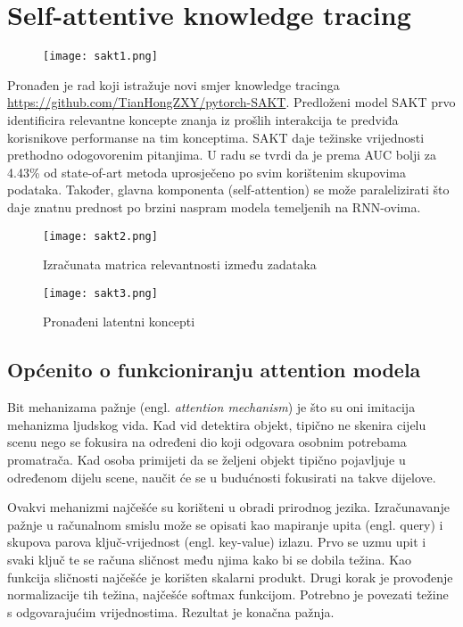 
\chapter{Self-attentive knowledge tracing}
	\begin{figure}[!htb]
		\centering
		\texttt{[image: sakt1.png]}
		\caption{}
		\label{}
	\end{figure}
	Pronađen je rad koji istražuje novi smjer knowledge tracinga \url{https://github.com/TianHongZXY/pytorch-SAKT}. Predloženi model SAKT prvo identificira relevantne koncepte znanja iz prošlih interakcija te predviđa korisnikove performanse na tim konceptima. SAKT daje težinske vrijednosti prethodno odogovorenim pitanjima. U radu se tvrdi da je prema AUC bolji za 4.43\% od state-of-art metoda uprosječeno po svim korištenim skupovima podataka. Također, glavna komponenta (self-attention) se može paralelizirati što daje znatnu prednost po brzini naspram modela temeljenih na RNN-ovima.

		\begin{figure}[H]
		\centering
		\texttt{[image: sakt2.png]}
		\caption{Izračunata matrica relevantnosti između zadataka}
		\label{}
	\end{figure}
	\begin{figure}[!htb]
	\centering
	\texttt{[image: sakt3.png]}
	\caption{Pronađeni latentni koncepti}
	\label{}
\end{figure}

	\section{Općenito o funkcioniranju attention modela}
	Bit mehanizama pažnje (engl. \textit{attention mechanism}) je što su oni imitacija mehanizma ljudskog vida. Kad vid detektira objekt, tipično ne skenira cijelu scenu nego se fokusira na određeni dio koji odgovara osobnim potrebama promatrača. Kad osoba primijeti da se željeni objekt tipično pojavljuje u određenom dijelu scene, naučit će se u budućnosti fokusirati na takve dijelove.

	Ovakvi mehanizmi najčešće su korišteni u obradi prirodnog jezika. Izračunavanje pažnje u računalnom smislu može se opisati kao mapiranje upita (engl. {query}) i skupova parova ključ-vrijednost (engl. {key-value}) izlazu. Prvo se uzmu upit i svaki ključ te se računa sličnost među njima kako bi se dobila težina. Kao funkcija sličnosti najčešće je korišten skalarni produkt. Drugi korak je provođenje normalizacije tih težina, najčešće softmax funkcijom. Potrebno je povezati težine s odgovarajućim vrijednostima. Rezultat je konačna pažnja. 

